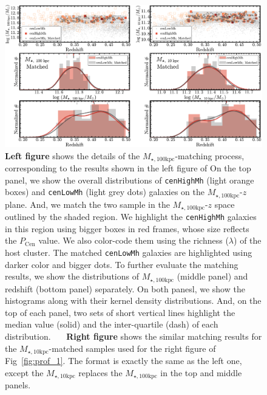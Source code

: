 \documentclass[a4paper,fleqn,usenatbib]{mnras}
\def\rbcg{\texttt{cenHighMh}}
\def\nbcg{\texttt{cenLowMh}}
\def\minn{{$M_{\star,10\mathrm{kpc}}$}}
\def\mtot{{$M_{\star,100\mathrm{kpc}}$}}
\begin{document}
\begin{figure}
    \centering 
    \includegraphics[width=16cm]{fig/redbcg_match}
    \caption{
        \textbf{Left figure} shows the details of the \mtot{}-matching process, 
        corresponding to the results shown in the left figure of   
        On the top panel, we show the overall distributions of \rbcg{} (light orange boxes) 
        and \nbcg{} (light grey dots) galaxies on the \mtot{}-$z$ plane.  
        And, we match the two sample in the \mtot{}-$z$ space outlined by the shaded region.
        We highlight the \rbcg{} galaxies in this region using bigger boxes in red frames, 
        whose size reflects the $P_{\mathrm{Cen}}$ value.  
        We also color-code them using the richness ($\lambda$) of the host cluster. 
        The matched \nbcg{} galaxies are highlighted using darker color and bigger dots. 
        To further evaluate the matching results, we show the distributions of \mtot{} 
        (middle panel) and redshift (bottom panel) separately. 
        On both panesl, we show the histograms along with their kernel density 
        distributions.  
        And, on the top of each panel, two sets of short vertical lines highlight the median 
        value (solid) and the inter-quartile (dash) of each distribution.~~~
        \textbf{Right figure} shows the similar matching results for the \minn{}-matched
        samples used for the right figure of Fig~\ref{fig:prof_1}.
        The format is exactly the same as the left one, except the \minn{} replaces the 
        \mtot{} in the top and middle panels.}
    \label{fig:match}
\end{figure}
\end{document}
